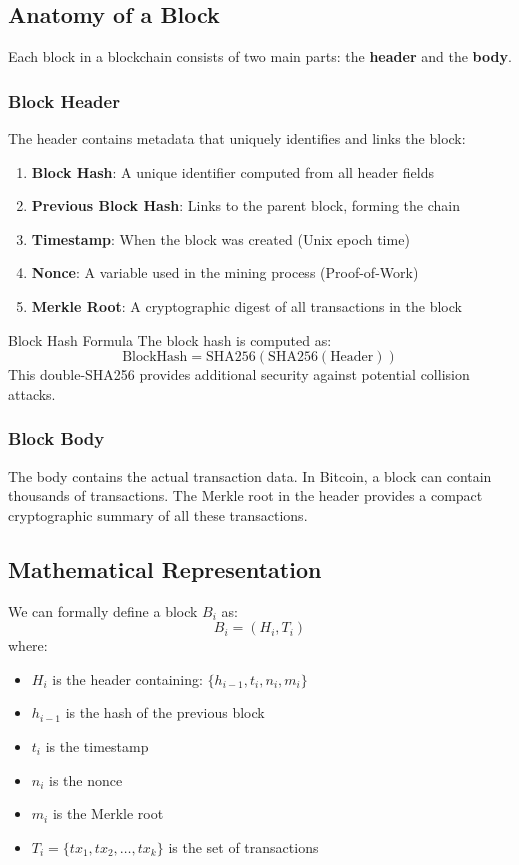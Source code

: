 \documentclass[11pt,a4paper]{article}
\begin{document}
\subsection{Anatomy of a Block}

Each block in a blockchain consists of two main parts: the \textbf{header} and the \textbf{body}.

\subsubsection{Block Header}

The header contains metadata that uniquely identifies and links the block:

\begin{enumerate}
  \item \textbf{Block Hash}: A unique identifier computed from all header fields
  \item \textbf{Previous Block Hash}: Links to the parent block, forming the chain
  \item \textbf{Timestamp}: When the block was created (Unix epoch time)
  \item \textbf{Nonce}: A variable used in the mining process (Proof-of-Work)
  \item \textbf{Merkle Root}: A cryptographic digest of all transactions in the block
\end{enumerate}

\begin{keybox}{Block Hash Formula}
The block hash is computed as:
\[
\text{BlockHash} = \text{SHA256}(\text{SHA256}(\text{Header}))
\]
This double-SHA256 provides additional security against potential collision attacks.
\end{keybox}

\subsubsection{Block Body}

The body contains the actual transaction data. In Bitcoin, a block can contain thousands of transactions. The Merkle root in the header provides a compact cryptographic summary of all these transactions.

\subsection{Mathematical Representation}

We can formally define a block $B_i$ as:
\[
B_i = (H_i, T_i)
\]
where:
\begin{itemize}
  \item $H_i$ is the header containing: $\{h_{i-1}, t_i, n_i, m_i\}$
  \item $h_{i-1}$ is the hash of the previous block
  \item $t_i$ is the timestamp
  \item $n_i$ is the nonce
  \item $m_i$ is the Merkle root
  \item $T_i = \{tx_1, tx_2, \ldots, tx_k\}$ is the set of transactions
\end{itemize}
\end{document}
